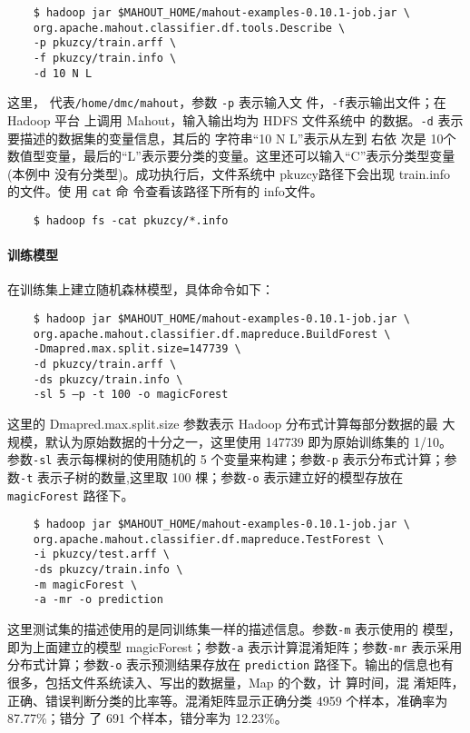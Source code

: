\begin{lstlisting}
	$ hadoop jar $MAHOUT_HOME/mahout-examples-0.10.1-job.jar \
	org.apache.mahout.classifier.df.tools.Describe \
	-p pkuzcy/train.arff \
	-f pkuzcy/train.info \
	-d 10 N L
\end{lstlisting}

这里， 代表\texttt{/home/dmc/mahout}，参数 \lstinline|-p| 表示输入文
件，\lstinline|-f|表示输出文件；在 Hadoop 平台 上调用 Mahout，输入输出均为 HDFS 文件系统中
的数据。\lstinline|-d| 表示要描述的数据集的变量信息，其后的 字符串``10 N L''表示从左到 右依
次是 10个数值型变量，最后的``L''表示要分类的变量。这里还可以输入``C''表示分类型变量(本例中
没有分类型)。成功执行后，文件系统中 pkuzcy路径下会出现 train.info 的文件。使
用 \lstinline|cat| 命 令查看该路径下所有的 info文件。

\begin{lstlisting}
	$ hadoop fs -cat pkuzcy/*.info
\end{lstlisting}

\paragraph{训练模型}\label{ux8badux7ec3ux6a21ux578b}

在训练集上建立随机森林模型，具体命令如下：

\begin{lstlisting}
	$ hadoop jar $MAHOUT_HOME/mahout-examples-0.10.1-job.jar \
	org.apache.mahout.classifier.df.mapreduce.BuildForest \
	-Dmapred.max.split.size=147739 \
	-d pkuzcy/train.arff \
	-ds pkuzcy/train.info \
	-sl 5 –p -t 100 -o magicForest
\end{lstlisting}

这里的 Dmapred.max.split.size 参数表示 Hadoop 分布式计算每部分数据的最
大规模，默认为原始数据的十分之一，这里使用 147739 即为原始训练集的 1/10。
参数\texttt{-sl} 表示每棵树的使用随机的 5 个变量来构建；参数\texttt{-p} 表示分布式计算；参
数\texttt{-t} 表示子树的数量,这里取 100 棵；参数\texttt{-o} 表示建立好的模型存放在
\texttt{magicForest} 路径下。

\begin{lstlisting}
	$ hadoop jar $MAHOUT_HOME/mahout-examples-0.10.1-job.jar \
	org.apache.mahout.classifier.df.mapreduce.TestForest \
	-i pkuzcy/test.arff \
	-ds pkuzcy/train.info \
	-m magicForest \
	-a -mr -o prediction
\end{lstlisting}

这里测试集的描述使用的是同训练集一样的描述信息。参数\texttt{-m} 表示使用的
模型，即为上面建立的模型 magicForest；参数\texttt{-a} 表示计算混淆矩阵；参数\texttt{-mr}
表示采用分布式计算；参数\texttt{-o} 表示预测结果存放在 \texttt{prediction}
路径下。输出的信息也有很多，包括文件系统读入、写出的数据量，Map 的个数，计
算时间，混 淆矩阵，正确、错误判断分类的比率等。混淆矩阵显示正确分类 4959
个样本，准确率为 87.77\%；错分 了 691 个样本，错分率为 12.23\%。

